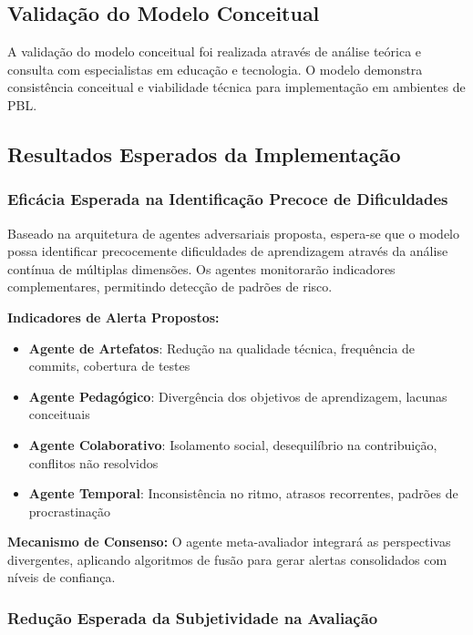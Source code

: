 \documentclass[english, spanish, brazilian]{modelo_dt}
\begin{document}
\subsection{Validação do Modelo Conceitual}

A validação do modelo conceitual foi realizada através de análise teórica e
consulta com especialistas em educação e tecnologia\@. O modelo demonstra
consistência conceitual e viabilidade técnica para implementação em ambientes
de PBL\@.

\subsection{Resultados Esperados da Implementação}

\subsubsection{Eficácia Esperada na Identificação Precoce de Dificuldades}

Baseado na arquitetura de agentes adversariais proposta, espera-se que o modelo
possa identificar precocemente dificuldades de aprendizagem através da análise
contínua de múltiplas dimensões\@. Os agentes monitorarão indicadores
complementares, permitindo detecção de padrões de risco\@.

\textbf{Indicadores de Alerta Propostos:}
\begin{itemize}
  \item \textbf{Agente de Artefatos}: Redução na qualidade técnica, frequência de commits, cobertura de testes
  \item \textbf{Agente Pedagógico}: Divergência dos objetivos de aprendizagem, lacunas conceituais
  \item \textbf{Agente Colaborativo}: Isolamento social, desequilíbrio na contribuição, conflitos não resolvidos
  \item \textbf{Agente Temporal}: Inconsistência no ritmo, atrasos recorrentes, padrões de procrastinação
\end{itemize}

\textbf{Mecanismo de Consenso:}
O agente meta-avaliador integrará as perspectivas divergentes, aplicando algoritmos de fusão para gerar alertas consolidados com níveis de confiança\@.

\subsubsection{Redução Esperada da Subjetividade na Avaliação}
\end{document}

